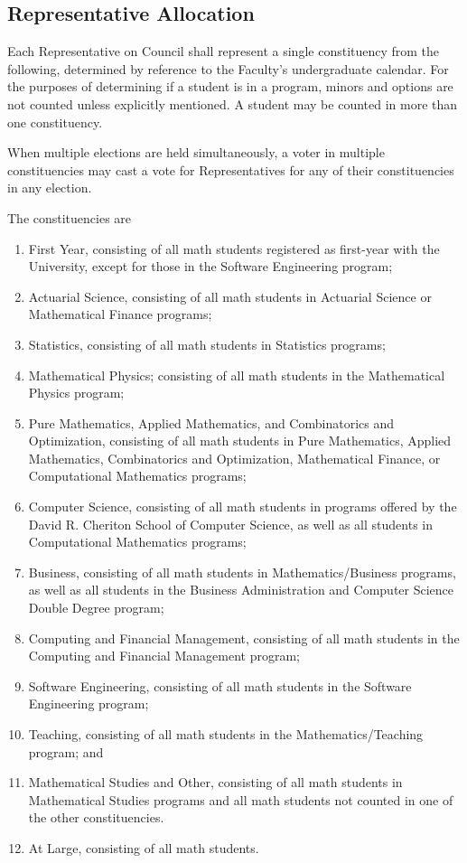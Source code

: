 \subsection{Representative Allocation}
Each Representative on Council shall represent a single constituency from the
following, determined by reference to the Faculty's undergraduate calendar. For
the purposes of determining if a student is in a program, minors and options are
not counted unless explicitly mentioned. A student may be
counted in more than one constituency. 

When multiple elections are held simultaneously, a voter in multiple
constituencies may cast a vote for Representatives for any of their constituencies in
any election.

The constituencies are
\begin{enumerate}
  \item First Year, consisting of all math students registered as first-year
    with the University, except for those in the Software Engineering program;
  \item Actuarial Science, consisting of all math students in Actuarial Science
    or Mathematical Finance programs;
  \item Statistics, consisting of all math students in Statistics programs;
  \item Mathematical Physics; consisting of all math students in the 
    Mathematical Physics program;
  \item Pure Mathematics, Applied Mathematics, and Combinatorics and
    Optimization, consisting of all math students in Pure Mathematics, Applied
    Mathematics, Combinatorics and Optimization, Mathematical Finance, or
    Computational Mathematics programs;
  \item Computer Science, consisting of all math students in programs offered by
    the David R. Cheriton School of Computer Science, as well as all students in
    Computational Mathematics programs;
  \item Business, consisting of all math students in Mathematics/Business
    programs, as well as all students in the Business Administration and
    Computer Science Double Degree program;
  \item Computing and Financial Management, consisting of all math students in
    the Computing and Financial Management program;
  \item Software Engineering, consisting of all math students in the Software
    Engineering program;
  \item Teaching, consisting of all math students in the
    Mathematics/Teaching program;
    and
  \item Mathematical Studies and Other, consisting of all math students in
    Mathematical Studies programs and all math students not counted in one of
    the other constituencies.
  \item At Large, consisting of all math students.  
\end{enumerate}

